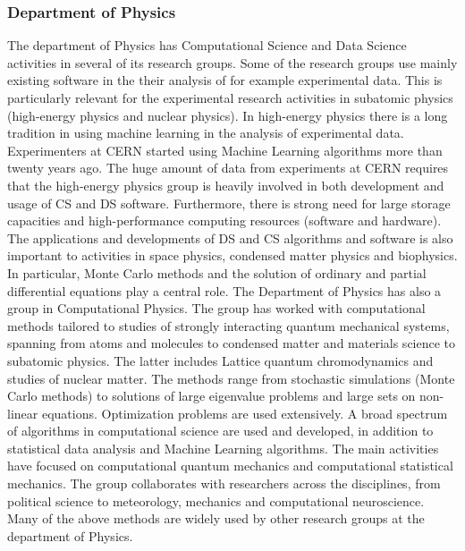 \documentclass[a4paper,10pt]{article}
\begin{document}
\subsubsection*{Department of Physics}

The department of Physics has Computational Science and Data Science activities in several of its research groups. Some of the research groups use mainly existing software in the their analysis of for example experimental data. This is particularly relevant for the experimental research activities in subatomic physics (high-energy physics and nuclear physics). In high-energy physics there is a long tradition in using machine learning in the analysis of experimental data. Experimenters at CERN started using Machine Learning algorithms more than twenty years ago. The huge amount of data from experiments at CERN requires that the  high-energy physics group is heavily involved in both development and usage of CS and DS software. Furthermore, there is strong need for large storage capacities and high-performance computing resources (software and hardware).  
The applications and developments of DS and CS algorithms and software is also important to activities in space physics, condensed matter physics and biophysics. In particular, Monte Carlo methods and  the solution of ordinary and partial differential equations play a central role. 
The Department of Physics has also a group in Computational Physics. The group has worked with computational methods tailored to studies of strongly interacting quantum mechanical systems, spanning from atoms and molecules to condensed matter and materials science to subatomic physics. The latter includes Lattice quantum chromodynamics and studies of nuclear matter. The methods range from stochastic simulations (Monte Carlo methods) to solutions of large eigenvalue problems and large sets on non-linear equations. Optimization problems are used extensively. A broad spectrum of algorithms in computational science are used and developed, in addition to statistical data analysis and Machine Learning algorithms. The main activities have focused on computational quantum mechanics and computational statistical mechanics. The group collaborates with researchers across the disciplines, from political science to meteorology, mechanics and computational neuroscience.  Many of the above methods are widely used by other research groups at the department of Physics. 
\end{document}
